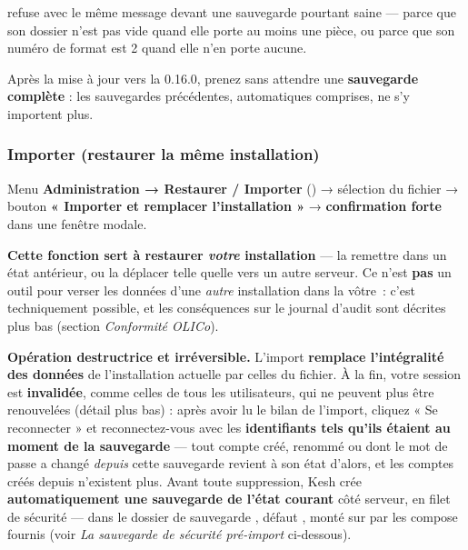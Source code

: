 \documentclass[a4paper,11pt,oneside]{article}
\begin{document}
refuse avec le même message devant une sauvegarde pourtant saine --- parce que son dossier  n'est pas vide quand elle porte au moins une pièce, ou parce que son numéro de format est 2 quand elle n'en porte aucune.

\begin{keshwarning}
Après la mise à jour vers la 0.16.0, prenez sans attendre une \textbf{sauvegarde complète} : les sauvegardes précédentes, automatiques comprises, ne s'y importent plus.
\end{keshwarning}

\subsubsection{Importer (restaurer la même installation)}

Menu \textbf{Administration → Restaurer / Importer} () → sélection du fichier  → bouton \textbf{« Importer et remplacer l'installation »} → \textbf{confirmation forte} dans une fenêtre modale.

\textbf{Cette fonction sert à restaurer \emph{votre} installation} --- la remettre dans un état antérieur, ou la déplacer telle quelle vers un autre serveur. Ce n'est \textbf{pas} un outil pour verser les données d'une \emph{autre} installation dans la vôtre~: c'est techniquement possible, et les conséquences sur le journal d'audit sont décrites plus bas (section \emph{Conformité OLICo}).

\begin{keshwarning}
\textbf{Opération destructrice et irréversible.} L'import \textbf{remplace l'intégralité des données} de l'installation actuelle par celles du fichier. À la fin, votre session est \textbf{invalidée}, comme celles de tous les utilisateurs, qui ne peuvent plus être renouvelées (détail plus bas) : après avoir lu le bilan de l'import, cliquez « Se reconnecter » et reconnectez-vous avec les \textbf{identifiants tels qu'ils étaient au moment de la sauvegarde} --- tout compte créé, renommé ou dont le mot de passe a changé \emph{depuis} cette sauvegarde revient à son état d'alors, et les comptes créés depuis n'existent plus. Avant toute suppression, Kesh crée \textbf{automatiquement une sauvegarde de l'état courant} côté serveur, en filet de sécurité --- dans le dossier de sauvegarde , défaut , monté sur  par les compose fournis (voir \emph{La sauvegarde de sécurité pré-import} ci-dessous).
\end{keshwarning}
\end{document}
